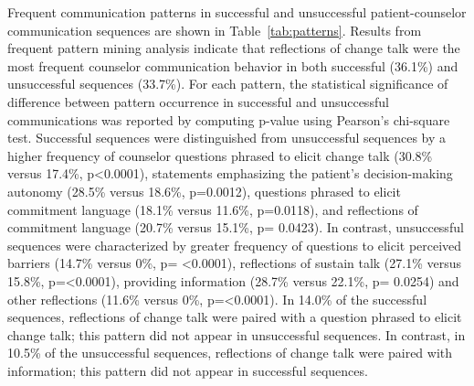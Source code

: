 Frequent communication patterns in successful and unsuccessful patient-counselor communication sequences are shown in Table~\ref{tab:patterns}. Results from frequent pattern mining analysis indicate that reflections of change talk were the most frequent counselor communication behavior in both successful (36.1\%) and unsuccessful sequences (33.7\%). For each pattern, the statistical significance of difference between pattern occurrence in successful and unsuccessful communications was reported by computing p-value using Pearson’s chi-square test. Successful sequences were distinguished from unsuccessful sequences by a higher frequency of counselor questions phrased to elicit change talk (30.8\% versus 17.4\%, p<0.0001), statements emphasizing the patient’s decision-making autonomy (28.5\% versus 18.6\%, p=0.0012), questions phrased to elicit commitment language (18.1\% versus 11.6\%, p=0.0118), and reflections of commitment language (20.7\% versus 15.1\%, p= 0.0423). In contrast, unsuccessful sequences were characterized by greater frequency of questions to elicit perceived barriers (14.7\% versus 0\%, p= <0.0001), reflections of sustain talk (27.1\% versus 15.8\%, p=<0.0001), providing information (28.7\% versus 22.1\%, p= 0.0254) and other reflections (11.6\% versus 0\%, p=<0.0001). In 14.0\% of the successful sequences, reflections of change talk were paired with a question phrased to elicit change talk; this pattern did not appear in unsuccessful sequences. In contrast, in 10.5\% of the unsuccessful sequences, reflections of change talk were paired with information; this pattern did not appear in successful sequences.

